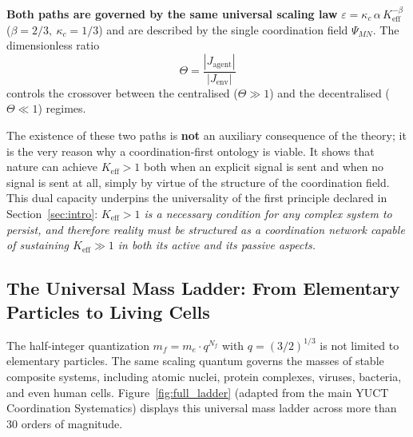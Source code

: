 \documentclass[12pt,a4paper]{article}
\begin{document}
\medskip
\noindent
\textbf{Both paths are governed by the same universal scaling law}
\(\varepsilon = \kappa_c\,\alpha\,K_{\mathrm{eff}}^{-\beta}\)
(\(\beta = 2/3,\ \kappa_c = 1/3\)) and are described by the single
coordination field \(\Psi_{MN}\). The dimensionless ratio
\[
\Theta = \frac{|J_{\mathrm{agent}}|}{|J_{\mathrm{env}}|}
\]
controls the crossover between the centralised (\(\Theta \gg 1\)) and the
decentralised (\(\Theta \ll 1\)) regimes.

The existence of these two paths is \textbf{not} an auxiliary consequence of
the theory; it is the very reason why a coordination‑first ontology is
viable. It shows that nature can achieve \(K_{\mathrm{eff}} > 1\) both when
an explicit signal is sent and when no signal is sent at all, simply by
virtue of the structure of the coordination field. This dual capacity
underpins the universality of the first principle declared in
Section~\ref{sec:intro}: \emph{\(K_{\mathrm{eff}} > 1\) is a necessary
	condition for any complex system to persist, and therefore reality must
	be structured as a coordination network capable of sustaining
	\(K_{\mathrm{eff}} \gg 1\) in both its active and its passive aspects.}

\subsection{The Universal Mass Ladder: From Elementary Particles to Living Cells}
\label{subsec:universal-ladder}

The half‑integer quantization \(m_f = m_e \cdot q^{N_f}\) with \(q = (3/2)^{1/3}\) is not limited to elementary particles. The same scaling quantum governs the masses of stable composite systems, including atomic nuclei, protein complexes, viruses, bacteria, and even human cells. Figure~\ref{fig:full_ladder} (adapted from the main YUCT Coordination Systematics) displays this universal mass ladder across more than 30 orders of magnitude.
\end{document}
